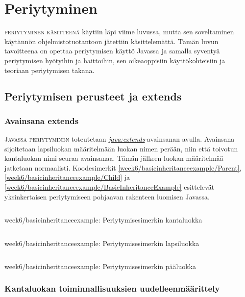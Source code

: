 \documentclass[openany]{book}
\newcommand{\newthought}[1]{\smallskip\textsc{#1}}
\newcommand{\java}[1]{\underline{\gls{java:#1}}}
\newcommand{\newjava}[1]{\textit{\java{#1}}}
\newcommand{\code}[3]{
	\begin{listing}
		\linespread{0.85}
		\inputminted{java}{OhjelmointiopasEsimerkit/src/#1/#2.java}
		\caption{#1: #3}
		\label{#1/#2}
	\end{listing}
}
\begin{document}

\chapter{Periytyminen}
\label{periytyminen2}

\newthought{\Gls{periytyminen} käsitteenä} käytiin läpi viime luvussa, mutta sen soveltaminen
käytännön ohjelmistotuotantoon jätettiin käsittelemättä. Tämän luvun tavoitteena on opettaa
periytymisen käyttö Javassa ja samalla syventyä periytymisen hyötyihin ja haittoihin, sen
oikeaoppisiin käyttökohteisiin ja teoriaan periytymisen takana.


\section{Periytymisen perusteet ja extends}
\label{periytyminen3}

\subsection{Avainsana extends}
\label{extends}

\newthought{Javassa \gls{periytyminen}} toteutetaan \newjava{extends}-avainsanan avulla. Avainsana
sijoitetaan lapsiluokan määritelmään luokan nimen perään, niin että toivotun kantaluokan nimi
seuraa avainsanaa. Tämän jälkeen luokan määritelmää jatketaan normaalisti. Koodesimerkit
\ref{week6/basicinheritanceexample/Parent}, \ref{week6/basicinheritanceexample/Child} ja
\ref{week6/basicinheritanceexample/BasicInheritanceExample} esittelevät yksinkertaisen
periytymiseen pohjaavan rakenteen luomisen Javassa.

\code{week6/basicinheritanceexample}{Parent}{Periytymisesimerkin kantaluokka}
\code{week6/basicinheritanceexample}{Child}{Periytymisesimerkin lapsiluokka}
\code{week6/basicinheritanceexample}{BasicInheritanceExample}{Periytymisesimerkin pääluokka}

\subsection{Kantaluokan toiminnallisuuksien uudelleenmäärittely}
\label{overriding}
\end{document}
